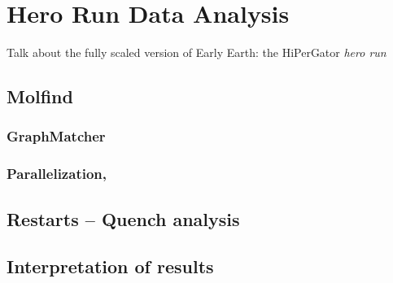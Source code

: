 \chapter{Hero Run Data Analysis} 

Talk about the fully scaled version of Early Earth: the HiPerGator \textit{hero run}

\section{Molfind}

\subsection{GraphMatcher}

\subsection{Parallelization, }


\section{Restarts -- Quench analysis}

\section{Interpretation of results}